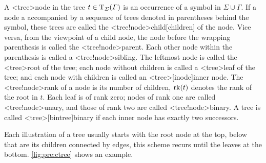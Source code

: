 \documentclass[../document.tex]{subfiles}
\begin{document}
    A <tree>{node} in the tree \(t \in \operatorname{T}_\varSigma(\varGamma)\) is an occurrence of a symbol in \(\varSigma \cup \varGamma\).
    If a node a accompanied by a sequence of trees denoted in parentheses behind the symbol, these trees are called the <tree!node>{child}[children] of the node.
    Vice versa, from the viewpoint of a child node, the node before the wrapping parenthesis is called the <tree!node>{parent}.
    Each other node within the parenthesis is called a <tree!node>{sibling}.
    The leftmost node is called the <tree>{root} of the tree; each node without children is called a <tree>{leaf} of the tree; and each node with children is called an <tree>[inode]{inner node}.
    The <tree!node>{rank} of a node is its number of children, \(\operatorname{rk}(t)\) denotes the rank of the root in \(t\).
    Each leaf is of rank zero; nodes of rank one are called <tree!node>{unary}, and those of rank two are called <tree!node>{binary}.
    A tree is called <tree>[bintree]{binary} if each inner node has exactly two successors.

    Each illustration of a tree usually starts with the root node at the top, below that are its children connected by edges, this scheme recurs until the leaves at the bottom.
    \cref{fig:pre:ctree} shows an example.
\end{document}
